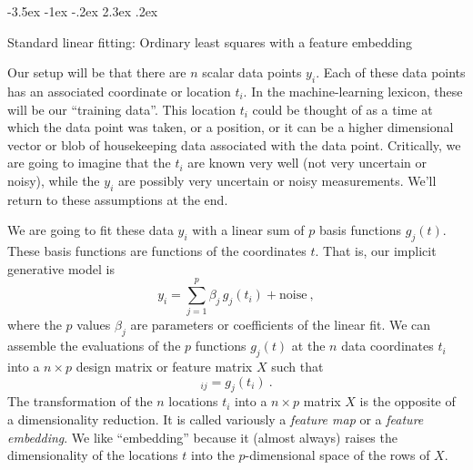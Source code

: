 \documentclass[12pt,letterpaper]{article}
\makeatletter
\renewcommand\section{\@startsection {section}{1}{\z@}%
  {-3.5ex \@plus -1ex \@minus -.2ex}%
  {2.3ex \@plus.2ex}%
  {\raggedright\normalfont\Large\bfseries}}
\makeatother
\begin{document}
\section{Standard linear fitting: Ordinary least squares with a feature embedding}\label{sec:ols}

Our setup will be that there are $n$ scalar data points $y_i$.
Each of these data points has an associated coordinate or location $t_i$.
In the machine-learning lexicon, these will be our ``training data''.
This location $t_i$ could be thought of as a time at which the data point was taken, or a position, or it can be a higher dimensional vector or blob of housekeeping data associated with the data point.
Critically, we are going to imagine that the $t_i$ are known very well (not very uncertain or noisy), while the $y_i$ are possibly very uncertain or noisy measurements.
We'll return to these assumptions at the end.

We are going to fit these data $y_i$ with a linear sum of $p$ basis functions $g_j(t)$. These basis functions are functions of the coordinates $t$. That is, our implicit generative model is
\begin{equation}
    y_i = \sum_{j=1}^p \beta_j\,g_j(t_i) + \mathrm{noise}
    ~,
\label{eq.model}
\end{equation}
where the $p$ values $\beta_j$ are parameters or coefficients of the linear fit. We can assemble the evaluations of the $p$ functions $g_j(t)$ at the $n$ data coordinates $t_i$ into a $n\times p$ design matrix or feature matrix $X$ such that
\begin{equation}
    [X]_{ij} = g_j(t_i)
    ~.
\end{equation}
The transformation of the $n$ locations $t_i$ into a $n\times p$ matrix $X$ is the opposite of a dimensionality reduction.
It is called variously a \emph{feature map} or a \emph{feature embedding}.
We like ``embedding'' because it (almost always) raises the dimensionality of the locations $t$ into the $p$-dimensional space of the rows of $X$.
\end{document}
